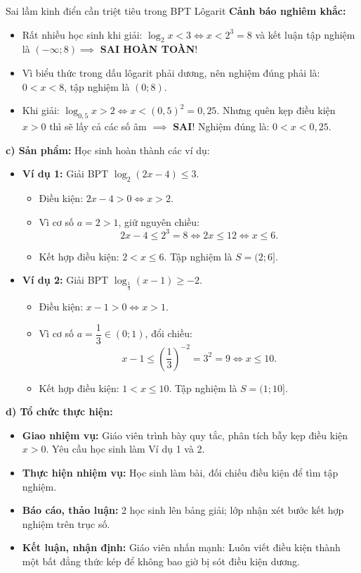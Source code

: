 \documentclass[12pt, a4paper]{article}
\begin{document}
\begin{scaffoldbox}{Sai lầm kinh điển cần triệt tiêu trong BPT Lôgarit}
\textbf{Cảnh báo nghiêm khắc:}
\begin{itemize}
    \item Rất nhiều học sinh khi giải: $\log_2 x < 3 \iff x < 2^3 = 8$ và kết luận tập nghiệm là $(-\infty; 8) \implies$ \textbf{SAI HOÀN TOÀN}!
    \item Vì biểu thức trong dấu lôgarit phải dương, nên nghiệm đúng phải là: $0 < x < 8$, tập nghiệm là $(0; 8)$.
    \item Khi giải: $\log_{0{,}5} x > 2 \iff x < (0{,}5)^2 = 0{,}25$. Nhưng quên kẹp điều kiện $x > 0$ thì sẽ lấy cả các số âm $\implies$ \textbf{SAI}! Nghiệm đúng là: $0 < x < 0{,}25$.
\end{itemize}
\end{scaffoldbox}

\noindent \textbf{c) Sản phẩm:}
Học sinh hoàn thành các ví dụ:
\begin{itemize}
    \item \textbf{Ví dụ 1:} Giải BPT $\log_2 (2x - 4) \le 3$.
    \begin{itemize}
        \item Điều kiện: $2x - 4 > 0 \iff x > 2$.
        \item Vì cơ số $a = 2 > 1$, giữ nguyên chiều:
        $$2x - 4 \le 2^3 = 8 \iff 2x \le 12 \iff x \le 6.$$
        \item Kết hợp điều kiện: $2 < x \le 6$. Tập nghiệm là $S = (2; 6]$.
    \end{itemize}
    \item \textbf{Ví dụ 2:} Giải BPT $\log_{\frac{1}{3}} (x - 1) \ge -2$.
    \begin{itemize}
        \item Điều kiện: $x - 1 > 0 \iff x > 1$.
        \item Vì cơ số $a = \dfrac{1}{3} \in (0; 1)$, đổi chiều:
        $$x - 1 \le \left(\dfrac{1}{3}\right)^{-2} = 3^2 = 9 \iff x \le 10.$$
        \item Kết hợp điều kiện: $1 < x \le 10$. Tập nghiệm là $S = (1; 10]$.
    \end{itemize}
\end{itemize}

\noindent \textbf{d) Tổ chức thực hiện:}
\begin{itemize}[leftmargin=0.6cm]
    \item \textbf{Giao nhiệm vụ:} Giáo viên trình bày quy tắc, phân tích bẫy kẹp điều kiện $x > 0$. Yêu cầu học sinh làm Ví dụ 1 và 2.
    \item \textbf{Thực hiện nhiệm vụ:} Học sinh làm bài, đối chiếu điều kiện để tìm tập nghiệm.
    \item \textbf{Báo cáo, thảo luận:} 2 học sinh lên bảng giải; lớp nhận xét bước kết hợp nghiệm trên trục số.
    \item \textbf{Kết luận, nhận định:} Giáo viên nhấn mạnh: Luôn viết điều kiện thành một bất đẳng thức kép để không bao giờ bị sót điều kiện dương.
\end{itemize}
\end{document}
